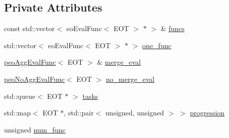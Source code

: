 \subsection*{Private Attributes}
\begin{CompactItemize}
\item 
\hypertarget{classpeoParaPopEval_6d69b8f73c0b5d72baf75d6e53f025b7}{
const std::vector$<$ eo\-Eval\-Func$<$ EOT $>$ $\ast$ $>$ \& \hyperlink{classpeoParaPopEval_6d69b8f73c0b5d72baf75d6e53f025b7}{funcs}}
\label{classpeoParaPopEval_6d69b8f73c0b5d72baf75d6e53f025b7}

\item 
\hypertarget{classpeoParaPopEval_f0e8af3ee442d2b6baf0bd122226be3c}{
std::vector$<$ eo\-Eval\-Func$<$ EOT $>$ $\ast$ $>$ \hyperlink{classpeoParaPopEval_f0e8af3ee442d2b6baf0bd122226be3c}{one\_\-func}}
\label{classpeoParaPopEval_f0e8af3ee442d2b6baf0bd122226be3c}

\item 
\hypertarget{classpeoParaPopEval_b48bcd4e9f92f364118304535c089456}{
\hyperlink{classpeoAggEvalFunc}{peo\-Agg\-Eval\-Func}$<$ EOT $>$ \& \hyperlink{classpeoParaPopEval_b48bcd4e9f92f364118304535c089456}{merge\_\-eval}}
\label{classpeoParaPopEval_b48bcd4e9f92f364118304535c089456}

\item 
\hypertarget{classpeoParaPopEval_bf255dd5861e27108c2abae7309d7690}{
\hyperlink{classpeoNoAggEvalFunc}{peo\-No\-Agg\-Eval\-Func}$<$ EOT $>$ \hyperlink{classpeoParaPopEval_bf255dd5861e27108c2abae7309d7690}{no\_\-merge\_\-eval}}
\label{classpeoParaPopEval_bf255dd5861e27108c2abae7309d7690}

\item 
\hypertarget{classpeoParaPopEval_af76cd18368a0f6185878f37f0b5f272}{
std::queue$<$ EOT $\ast$ $>$ \hyperlink{classpeoParaPopEval_af76cd18368a0f6185878f37f0b5f272}{tasks}}
\label{classpeoParaPopEval_af76cd18368a0f6185878f37f0b5f272}

\item 
\hypertarget{classpeoParaPopEval_80e7e34bb1bb2d12f1f2eed3feac6ecf}{
std::map$<$ EOT $\ast$, std::pair$<$ unsigned, unsigned $>$ $>$ \hyperlink{classpeoParaPopEval_80e7e34bb1bb2d12f1f2eed3feac6ecf}{progression}}
\label{classpeoParaPopEval_80e7e34bb1bb2d12f1f2eed3feac6ecf}

\item 
\hypertarget{classpeoParaPopEval_87abb090c0de39f0ccc36af1f07cca0c}{
unsigned \hyperlink{classpeoParaPopEval_87abb090c0de39f0ccc36af1f07cca0c}{num\_\-func}}
\label{classpeoParaPopEval_87abb090c0de39f0ccc36af1f07cca0c}


\end{CompactItemize}
